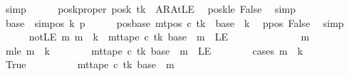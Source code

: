 \begin{isabellebody}
\ simp\isanewline
\ \ \ \ \isamarkupfalse%
\ poskproper{\isacharcolon}{\kern0pt}\ {\isachardoublequoteopen}posk\ tk\ {\isasymnoteq}\ AR{\isacharunderscore}{\kern0pt}AtLE{\isachardoublequoteclose}\ \isamarkupfalse%
\ poskle\ False\ \isamarkupfalse%
\ simp\isanewline
\ \ \ \ \isamarkupfalse%
\ {\isacharquery}{\kern0pt}base\ {\isacharequal}{\kern0pt}\ {\isachardoublequoteopen}sim{\isacharunderscore}{\kern0pt}pos\ {\isacharquery}{\kern0pt}k\ p{\isachardoublequoteclose}\isanewline
\ \ \ \ \isamarkupfalse%
\ pos{\isacharunderscore}{\kern0pt}base{\isacharcolon}{\kern0pt}\ {\isachardoublequoteopen}mt{\isacharunderscore}{\kern0pt}pos\ c{\isacharprime}{\kern0pt}\ tk\ {\isacharequal}{\kern0pt}\ {\isacharquery}{\kern0pt}base\ {\isacharplus}{\kern0pt}\ {\isacharquery}{\kern0pt}k{\isachardoublequoteclose}\ \isamarkupfalse%
\ ppos\ False\ \isamarkupfalse%
\ simp\isanewline
\ \ \ \ \isamarkupfalse%
\ notLE{\isacharcolon}{\kern0pt}\ {\isachardoublequoteopen}{\isasymAnd}m{\isachardot}{\kern0pt}\ m\ {\isasymle}\ {\isacharquery}{\kern0pt}k\ {\isasymLongrightarrow}\ mt{\isacharunderscore}{\kern0pt}tape\ c{\isacharprime}{\kern0pt}\ tk\ {\isacharparenleft}{\kern0pt}{\isacharquery}{\kern0pt}base\ {\isacharplus}{\kern0pt}\ m{\isacharparenright}{\kern0pt}\ {\isasymnoteq}\ LE{}{\isachardoublequoteclose}\isanewline
\ \ \ \ \isamarkupfalse%
\ {\isacharminus}{\kern0pt}\isanewline
\ \ \ \ \ \ \isamarkupfalse%
\ m\ \isamarkupfalse%
\ mle{\isacharcolon}{\kern0pt}\ {\isachardoublequoteopen}m\ {\isasymle}\ {\isacharquery}{\kern0pt}k{\isachardoublequoteclose}\isanewline
\ \ \ \ \ \ \isamarkupfalse%
\ {\isachardoublequoteopen}mt{\isacharunderscore}{\kern0pt}tape\ c{\isacharprime}{\kern0pt}\ tk\ {\isacharparenleft}{\kern0pt}{\isacharquery}{\kern0pt}base\ {\isacharplus}{\kern0pt}\ m{\isacharparenright}{\kern0pt}\ {\isasymnoteq}\ LE{}{\isachardoublequoteclose}\isanewline
\ \ \ \ \ \ \isamarkupfalse%
\ {\isacharparenleft}{\kern0pt}cases\ {\isachardoublequoteopen}m\ {\isacharless}{\kern0pt}\ {\isacharquery}{\kern0pt}k{\isachardoublequoteclose}{\isacharparenright}{\kern0pt}\isanewline
\ \ \ \ \ \ \ \ \isamarkupfalse%
\ True\isanewline
\ \ \ \ \ \ \ \ \isamarkupfalse%
\ {\isachardoublequoteopen}mt{\isacharunderscore}{\kern0pt}tape\ c{\isacharprime}{\kern0pt}\ tk\ {\isacharparenleft}{\kern0pt}{\isacharquery}{\kern0pt}base\ {\isacharplus}{\kern0pt}\ m{\isacharparenright}{\kern0pt}\isanewline

\end{isabellebody}
